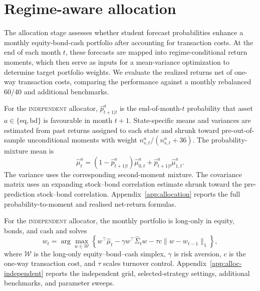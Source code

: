 \documentclass[10pt]{article}
\newcommand{\Bindep}{\textsc{independent}}
\begin{document}
\section{Regime-aware allocation}
\label{sec:alloc}

The allocation stage assesses whether student forecast probabilities enhance a monthly equity-bond-cash portfolio after accounting for transaction costs. At the end of each month $t$, these forecasts are mapped into regime-conditional return moments, which then serve as inputs for a mean-variance optimization to determine target portfolio weights. We evaluate the realized returns net of one-way transaction costs, comparing the performance against a monthly rebalanced 60/40 and additional benchmarks.

For the \Bindep{} allocator, \(\hat p^{a}_{t+1|t}\) is the end-of-month-\(t\) probability
that asset \(a\in\{\mathrm{eq},\mathrm{bd}\}\) is favourable in month \(t+1\). State-specific
means and variances are estimated from past returns assigned to each state and shrunk toward
pre-out-of-sample unconditional moments with weight \(n^a_{s,t}/(n^a_{s,t}+36)\). The
probability-mixture mean is
\begin{equation}
    \hat\mu^a_t
    =
    (1-\hat p^a_{t+1|t})\hat\mu^a_{0,t}
    +
    \hat p^a_{t+1|t}\hat\mu^a_{1,t}.
    \label{eq:independent-allocation-mean}
\end{equation}
The variance uses the corresponding second-moment mixture. The covariance matrix uses an
expanding stock--bond correlation estimate shrunk toward the pre-prediction stock--bond
correlation. Appendix~\ref{app:allocation} reports the full probability-to-moment and
realised net-return formulas.

For the \Bindep{} allocator, the monthly portfolio is long-only in equity, bonds, and cash and solves
\begin{equation}
    w_t
    =
    \arg\max_{w\in\mathcal W}
    \left\{
    w^{\top}\hat\mu_t
    -
    \gamma w^{\top}\hat\Sigma_t w
    -
    \tau c \lVert w-w_{t-1}\rVert_1
    \right\},
    \label{eq:mv}
\end{equation}
where \(\mathcal W\) is the long-only equity--bond--cash simplex, \(\gamma\) is risk aversion,
\(c\) is the one-way transaction cost, and \(\tau\) scales turnover control.
Appendix~\ref{app:alloc-independent} reports the independent grid, selected-strategy
settings, additional benchmarks, and parameter sweeps.
\end{document}
